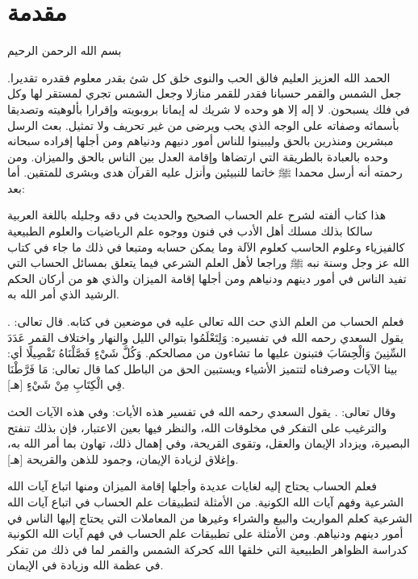 
\chapter{مقدمة}

\begin{center}
  بسم الله الرحمن الرحيم
\end{center}

الحمد الله العزيز العليم فالق الحب والنوى خلق كل شئ بقدر معلوم فقدره تقديرا. جعل الشمس والقمر حسبانا فقدر للقمر منازلا وجعل الشمس تجري لمستقر لها وكل في فلك يسبحون. لا إله إلا هو وحده لا شريك له  إيمانا بروبويته وإقرارا بألوهيته وتصديقا بأسمائه وصفاته على الوجه الذي يحب ويرضى من غير تحريف ولا تمثيل. بعث الرسل مبشرين ومنذرين بالحق وليبينوا للناس أمور دنيهم ودنياهم ومن أجلها إفراده سبحانه وحده بالعبادة بالطريقة التي ارتضاها وإقامة العدل بين الناس بالحق والميزان. ومن رحمته أنه أرسل محمدا ﷺ خاتما للنبيئين وأنزل عليه القرآن هدى وبشرى للمتقين. أما بعد:

هذا كتاب ألفته لشرح علم الحساب الصحيح والحديث في دقه وجليله باللغة العربية سالكا بذلك مسلك أهل الأدب في فنون ووجوه علم الرياضيات والعلوم الطبيعية كالفيزياء وعلوم الحاسب كعلوم الآلة وما يمكن حسابه ومتبعا في ذلك ما جاء في كتاب الله عز وجل وسنة نبه ﷺ وراجعا لأهل العلم الشرعي فيما يتعلق بمسائل الحساب التي تفيد الناس في أمور دينهم ودنياهم ومن أجلها إقامة الميزان والذي هو من أركان الحكم الرشيد الذي أمر الله به.

فعلم الحساب من العلم الذي حث الله تعالى عليه في موضعين في كتابه.
قال تعالى: \quranayah*[17][12]{\footnotesize \surahname*[17]}.
يقول السعدي رحمه الله في تفسيره:
{ وَلِتَعْلَمُوا } بتوالي الليل والنهار واختلاف القمر { عَدَدَ السِّنِينَ وَالْحِسَابَ } فتبنون عليها ما تشاءون من مصالحكم. { وَكُلَّ شَيْءٍ فَصَّلْنَاهُ تَفْصِيلًا } أي: بينا الآيات وصرفناه لتتميز الأشياء ويستبين الحق من الباطل كما قال تعالى: { مَا فَرَّطْنَا فِي الْكِتَابِ مِنْ شَيْءٍ }
[هـ].

وقال تعالى: \quranayah*[10][5]{\footnotesize \surahname*[10]}.
يقول السعدي رحمه الله في تفسير هذه الأيات:
وفي هذه الآيات الحث والترغيب على التفكر في مخلوقات الله، والنظر فيها بعين الاعتبار، فإن بذلك تنفتح البصيرة، ويزداد الإيمان والعقل، وتقوى القريحة، وفي إهمال ذلك، تهاون بما أمر الله به، وإغلاق لزيادة الإيمان، وجمود للذهن والقريحة
[هـ].

فعلم الحساب يحتاج إليه لغايات عديدة وأجلها إقامة الميزان ومنها اتباع آيات الله الشرعية وفهم آيات الله الكونية. من الأمثلة لتطبيقات علم الحساب في اتباع آيات الله الشرعية كعلم المواريث والبيع والشراء وغيرها من المعاملات التي يحتاج إليها الناس في أمور دينهم ودنياهم.  ومن الأمثلة على تطبيقات علم الحساب في فهم آيات الله الكونية كدراسة الظواهر الطبيعية التي خلقها الله كحركة الشمس والقمر لما في ذلك من تفكر في عظمة الله وزيادة في الإيمان.

